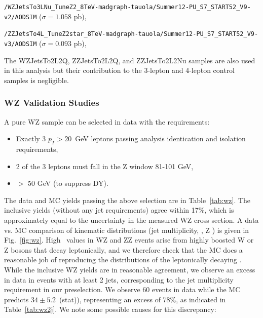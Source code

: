 \begin{itemize}
\footnotesize{
\item \verb=/WZJetsTo3LNu_TuneZ2_8TeV-madgraph-tauola/Summer12-PU_S7_START52_V9-v2/AODSIM= ($\sigma=1.058$ pb),
\item \verb=/ZZJetsTo4L_TuneZ2star_8TeV-madgraph-tauola/Summer12-PU_S7_START52_V9-v3/AODSIM= ($\sigma=0.093$ pb),
}
\end{itemize}
The WZJetsTo2L2Q, ZZJetsTo2L2Q, and ZZJetsTo2L2Nu samples are also used in this analysis but their contribution to the 3-lepton and 4-lepton
control samples is negligible.

\subsubsection{WZ Validation Studies}
\label{sec:bkg_wz}

A pure WZ sample can be selected in data with the requirements:

\begin{itemize}
\item Exactly 3 $p_T>20$~GeV leptons passing analysis identication and isolation requirements,
\item 2 of the 3 leptons must fall in the Z window 81-101 GeV,
\item \MET $>$ 50 GeV (to suppress DY).
\end{itemize}

The data and MC yields passing the above selection are in Table~\ref{tab:wz}. 
The inclusive yields (without any jet requirements) agree within 17\%, which is approximately equal
to the uncertainty in the measured WZ cross section. A data vs. MC comparison of kinematic
distributions (jet multiplicity, \MET, Z \pt) is given in Fig.~\ref{fig:wz}. High \MET\ 
values in WZ and ZZ events arise from highly boosted W or Z bosons that decay leptonically, 
and we therefore check that the MC does a reasonable job of reproducing the \pt distributions of the 
leptonically decaying \Z. While the inclusive WZ yields are in reasonable agreement, we observe
an excess in data in events with at least 2 jets, corresponding to the jet multiplicity requirement
in our preselection. We observe 60 events in data while the MC predicts $34\pm5.2$~(stat)), representing an excess of 78\%,
as indicated in Table~\ref{tab:wz2j}.
We note some possible causes for this discrepancy:

